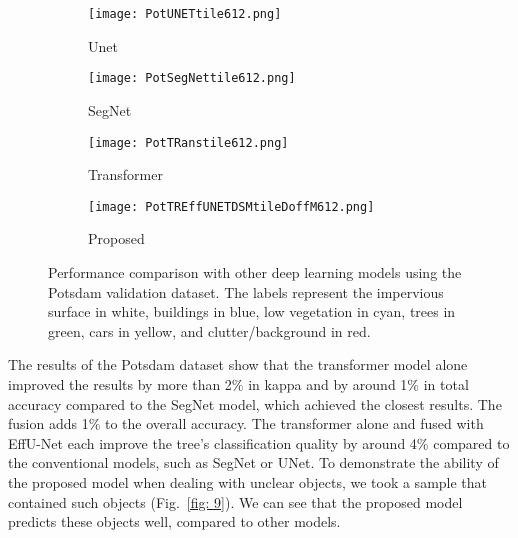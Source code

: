 \documentclass[journal]{IEEEtran}
\begin{document}
\begin{figure*}[hptb]
\hfill
\begin{subfigure}{.11\textwidth}
   \texttt{[image: PotUNETtile612.png]}
   \caption{Unet}
\end{subfigure}
\hfill
\begin{subfigure}{.11\textwidth}
   \texttt{[image: PotSegNettile612.png]}
   \caption{SegNet}
\end{subfigure}
\hfill
\begin{subfigure}{.11\textwidth}
   \texttt{[image: PotTRanstile612.png]}
   \caption{Transformer}
\end{subfigure}
\hfill
\begin{subfigure}{.11\textwidth}
   \texttt{[image: PotTREffUNETDSMtileDoffM612.png]}
   \caption{Proposed}
\end{subfigure}

\caption{Performance comparison with other deep learning models using the Potsdam validation dataset. The labels represent the impervious surface in white, buildings in blue, low vegetation in cyan, trees in green, cars in yellow, and clutter/background in red.}
\label{fig: 8}
\end{figure*}


The results of the Potsdam dataset show that the transformer model alone improved the results by more than 2\% in kappa and by around 1\% in total accuracy compared to the SegNet model, which achieved the closest results. The fusion adds 1\% to the overall accuracy. The transformer alone and fused with EffU-Net each improve the tree's classification quality by around 4\% compared to the conventional models, such as SegNet or UNet. To demonstrate the ability of the proposed model when dealing with unclear objects, we took a sample that contained such objects (Fig.~\ref{fig: 9}). We can see that the proposed model predicts these objects well, compared to other models.
\end{document}
